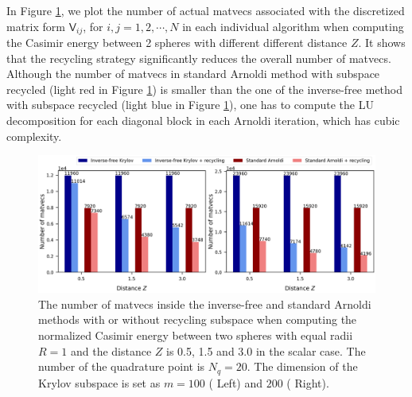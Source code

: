     In Figure \ref{fig:Num_matvec}, we plot the number of actual matvecs associated with the discretized matrix form $\mathsf{V}_{ij}$, for $i, j = 1, 2, \cdots, N$ in each individual algorithm when computing the Casimir energy between 2 spheres with different different distance $Z$. It shows that the recycling strategy significantly reduces the overall number of matvecs. Although the number of matvecs in standard Arnoldi method with subspace recycled (light red in Figure \ref{fig:Num_matvec}) is smaller than the one of the inverse-free method  with subspace recycled (light blue in Figure \ref{fig:Num_matvec}), one has to compute the LU decomposition for each diagonal block in each Arnoldi iteration, which has cubic complexity. 

    \begin{figure}[H]
        \centering
        \includegraphics[width = \textwidth]{figures/Num_matvec.png}
        \caption{The number of matvecs inside the inverse-free and standard Arnoldi methods with or without recycling subspace when 
        computing the normalized Casimir energy between two spheres with equal radii $R = 1$ and the distance $Z$ is 0.5, 1.5 and 3.0 in the scalar case. 
        The number of the quadrature point is $N_q = 20$. The dimension of the Krylov subspace is set as $m = 100$ ({\color{gray} Left}) and 
        $200$ ({\color{gray} Right}).}
        \label{fig:Num_matvec}
    \end{figure}


